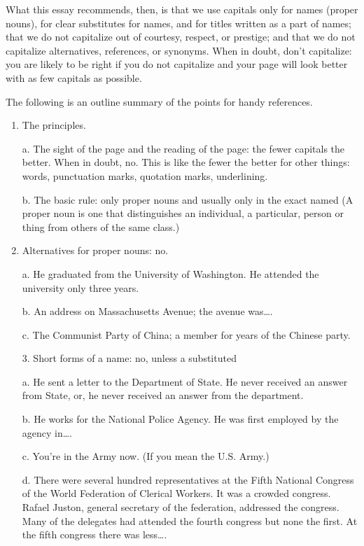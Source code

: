 \documentclass[
    oneside,
    11pt,
]{memoir}
\begin{document}
What this essay recommends, then, is that we use capitals only for names (proper nouns), for clear substitutes for names, and for titles written as a part of names; that we do not capitalize out of courtesy, respect, or prestige; and that we do not capitalize alternatives, references, or synonyms. When in doubt, don't capitalize: you are likely to be right if you do not capitalize and your page will look better with as few capitals as possible. 

The following is an outline summary of the points for handy references.
\begin{enumerate}
  \item The principles.

    a. The sight of the page and the reading of the page: the fewer capitals the better. When in doubt, no. This is like the fewer the better for other things: words, punctuation marks, quotation marks, underlining.

    b. The basic rule: only proper nouns and usually only in the exact named (A proper noun is one that distinguishes an individual, a particular, person or thing from others of the same class.)

  
    
    
  \item Alternatives for proper nouns: no. 
    
    a. He graduated from the University of Washington. He attended the university only three years.
    
    b. An address on Massachusetts Avenue; the avenue was\dots. 
    
    c. The Communist Party of China; a member for years of the Chinese party. 
    
    3. Short forms of a name: no, unless a substituted 
    
    a. He sent a letter to the Department of State. He never received an answer from State, or, he never received an answer from the department.
    
    b. He works for the National Police Agency. He was first employed by the agency in\dots. 
    
    c. You're in the Army now. (If you mean the U.S. Army.) 

    d. There were several hundred representatives at the Fifth National Congress of the World Federation of Clerical Workers. It was a crowded congress. Rafael Juston, general secretary of the federation, addressed the congress. Many of the delegates had attended the fourth congress but none the first. At the fifth congress there was less\dots. 


\end{enumerate}
\end{document}

